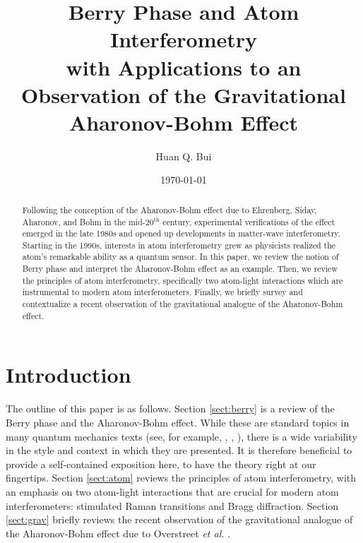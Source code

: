\documentclass[reprint,
nofootinbib,
amsmath,amssymb,
aps]{revtex4-1}
\begin{document}
	
	

\title{Berry Phase and Atom Interferometry\\with Applications to an Observation of the Gravitational Aharonov-Bohm Effect}
\author{Huan Q. Bui}
\date{\today}


\begin{abstract}
	Following the conception of the Aharonov-Bohm effect due to Ehrenberg, Siday, Aharonov, and Bohm in the mid-20$^\text{th}$ century, experimental verifications of the effect emerged in the late 1980s and opened up developments in matter-wave interferometry. Starting in the 1990s, interests in atom interferometry grew as physicists realized the atom's remarkable ability as a quantum sensor. In this paper, we review the notion of Berry phase and interpret the Aharonov-Bohm effect as an example. Then, we review the principles of atom interferometry, specifically two atom-light interactions which are instrumental to modern atom interferometers. Finally, we briefly survey and contextualize a recent observation of the gravitational analogue of the Aharonov-Bohm effect. 
\end{abstract}


\maketitle




\section{Introduction}




The outline of this paper is as follows.  Section \ref{sect:berry} is a review of the Berry phase and the Aharonov-Bohm effect. While these are standard topics in many quantum mechanics texts (see, for example, \cite{shankar2012principles}, \cite{griffiths2018introduction}, \cite{sakurai1995modern}), there is a wide variability in the style and context in which they are presented. It is therefore beneficial to provide a self-contained exposition here, to have the theory right at our fingertips. Section \ref{sect:atom} reviews the principles of atom interferometry, with an emphasis on two atom-light interactions that are crucial for modern atom interferometers: stimulated Raman transitions and Bragg diffraction. Section \ref{sect:grav} briefly reviews the recent observation of the gravitational analogue of the Aharonov-Bohm effect due to Overstreet \textit{et al.} \cite{overstreet2022observation}.
\end{document}
